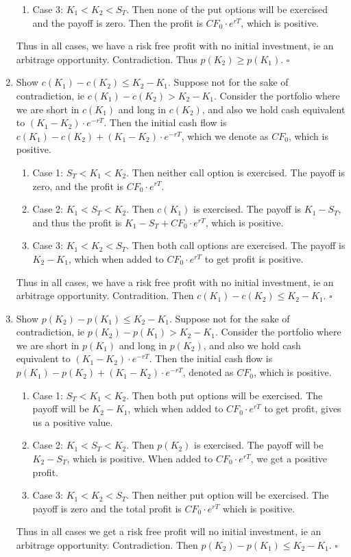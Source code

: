 \documentclass{article}
\begin{document}
\begin{enumerate}
\begin{enumerate}
            \item Case 3: $K_1 < K_2 < S_T$. Then none of the put options will be exercised and the payoff is zero. Then the profit is $CF_0 \cdot e^{rT}$, which is positive.
        \end{enumerate}
        Thus in all cases, we have a risk free profit with no initial investment, ie an arbitrage opportunity. Contradiction. Thus $p(K_2) \geq p(K_1)$. $\square$
    \item Show $c(K_1) - c(K_2) \leq K_2 - K_1$. Suppose not for the sake of contradiction, ie $c(K_1) - c(K_2) > K_2 - K_1$.
        Consider the portfolio where we are short in $c(K_1)$ and long in $c(K_2)$, and also we hold cash equivalent to $(K_1 - K_2) \cdot e^{-rT}$. Then the initial cash flow is $c(K_1) - c(K_2) + (K_1 - K_2)\cdot e^{-rT}$, which we denote as $CF_0$, which is positive.
        \begin{enumerate}
            \item Case 1: $S_T < K_1 < K_2$. Then neither call option is exercised. The payoff is zero, and the profit is $CF_0 \cdot e^{rT}$.
            \item Case 2: $K_1 < S_T < K_2$. Then $c(K_1)$ is exercised. The payoff is $K_1 - S_T$, and thus the profit is $K_1 - S_T + CF_0 \cdot e^{rT}$, which is positive.
            \item Case 3: $K_1 < K_2 < S_T$. Then both call options are exercised. The payoff is $K_2 - K_1$, which when added to $CF_0\cdot e^{rT}$ to get profit is positive.
        \end{enumerate}
        Thus in all cases, we have a risk free profit with no initial investment, ie an arbitrage opportunity. Contradition. Then $c(K_1) - c(K_2) \leq K_2 - K_1$. $\square$
    \item Show $p(K_2) - p(K_1) \leq K_2 - K_1$. Suppose not for the sake of contradiction, ie $p(K_2) - p(K_1) > K_2 - K_1$.
        Consider the portfolio where we are short in $p(K_1)$ and long in $p(K_2)$, and also we hold cash equivalent to $(K_1 - K_2) \cdot e^{-rT}$. Then the initial cash flow is $p(K_1) - p(K_2) + (K_1 - K_2) \cdot e^{-rT}$, denoted as $CF_0$, which is positive.
        \begin{enumerate}
            \item Case 1: $S_T < K_1 < K_2$. Then both put options will be exercised. The payoff will be $K_2 - K_1$, which when added to $CF_0 \cdot e^{rT}$ to get profit, gives us a positive value.
            \item Case 2: $K_1 < S_T < K_2$. Then $p(K_2)$ is exercised. The payoff will be $K_2 - S_T$, which is positive. When added to $CF_0 \cdot e^{rT}$, we get a positive profit.
            \item Case 3: $K_1 < K_2 < S_T$. Then neither put option will be exercised. The payoff is zero and the total profit is $CF_0 \cdot e^{rT}$ which is positive.
        \end{enumerate}
        Thus in all cases we get a risk free profit will no initial investment, ie an arbitrage opportunity. Contradiction. Then $p(K_2) - p(K_1) \leq K_2 - K_1$. $\square$
\end{enumerate}
\end{document}
